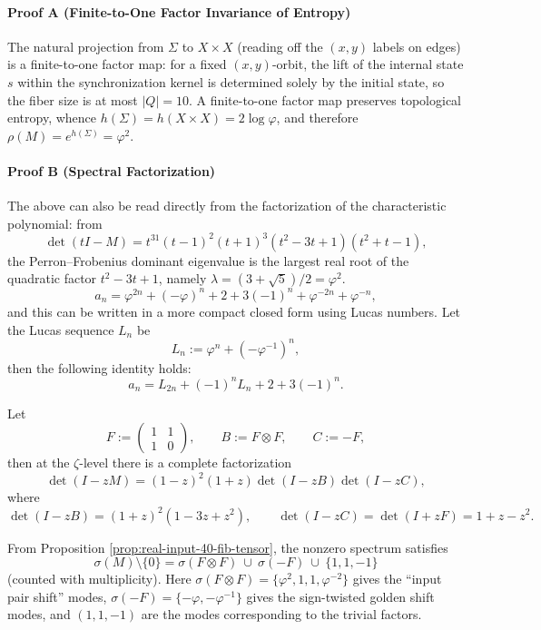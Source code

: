 \paragraph{Proof A (Finite-to-One Factor Invariance of Entropy)}
The natural projection from $\Sigma$ to $X\times X$ (reading off the $(x,y)$ labels on edges) is a finite-to-one factor map: for a fixed $(x,y)$-orbit,
the lift of the internal state $s$ within the synchronization kernel is determined solely by the initial state, so the fiber size is at most $|Q|=10$. A finite-to-one factor map preserves topological entropy,
whence $h(\Sigma)=h(X\times X)=2\log\varphi$, and therefore $\rho(M)=e^{h(\Sigma)}=\varphi^2$.

\paragraph{Proof B (Spectral Factorization)}
The above can also be read directly from the factorization of the characteristic polynomial: from
\[
\det(tI-M)=t^{31}(t-1)^2(t+1)^3(t^2-3t+1)(t^2+t-1),
\]
the Perron--Frobenius dominant eigenvalue is the largest real root of the quadratic factor $t^2-3t+1$, namely $\lambda=(3+\sqrt5)/2=\varphi^2$.
\[
a_n=\varphi^{2n}+(-\varphi)^n+2+3(-1)^n+\varphi^{-2n}+\varphi^{-n},
\]
and this can be written in a more compact closed form using Lucas numbers. Let the Lucas sequence $L_n$ be
\[
L_n:=\varphi^n+(-\varphi^{-1})^n,
\]
then the following identity holds:
\[
a_n=L_{2n}+(-1)^nL_n+2+3(-1)^n.
\]
\begin{proposition}\label{prop:real-input-40-fib-tensor}
Let
\[
F:=\begin{pmatrix}1&1\\[2pt]1&0\end{pmatrix},\qquad
B:=F\otimes F,\qquad
C:=-F,
\]
then at the $\zeta$-level there is a complete factorization
\[
\det(I-zM)=(1-z)^2(1+z)\det(I-zB)\det(I-zC),
\]
where
\[
\det(I-zB)=(1+z)^2(1-3z+z^2),\qquad
\det(I-zC)=\det(I+zF)=1+z-z^2.
\]
\end{proposition}

\begin{corollary}\label{cor:real-input-40-spectrum-decomp}
From Proposition \ref{prop:real-input-40-fib-tensor}, the nonzero spectrum satisfies
\[
\sigma(M)\setminus\{0\}
=\sigma(F\otimes F)\ \cup\ \sigma(-F)\ \cup\ \{1,1,-1\}
\]
(counted with multiplicity). Here $\sigma(F\otimes F)=\{\varphi^2,1,1,\varphi^{-2}\}$ gives the ``input pair shift'' modes, $\sigma(-F)=\{-\varphi,-\varphi^{-1}\}$ gives the sign-twisted golden shift modes, and $(1,1,-1)$ are the modes corresponding to the trivial factors.
\end{corollary}

